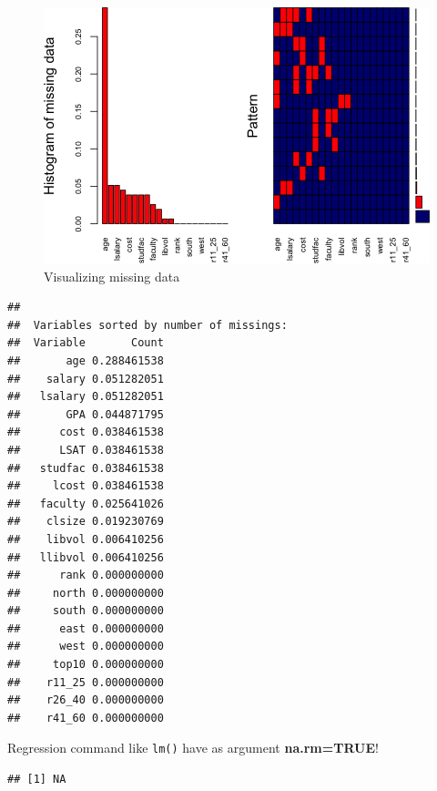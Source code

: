 \documentclass[]{book}
\newenvironment{Shaded}{\begin{snugshade}}{\end{snugshade}}
\newcommand{\CommentTok}[1]{\textcolor[rgb]{0.56,0.35,0.01}{\textit{#1}}}
\newcommand{\DataTypeTok}[1]{\textcolor[rgb]{0.13,0.29,0.53}{#1}}
\newcommand{\KeywordTok}[1]{\textcolor[rgb]{0.13,0.29,0.53}{\textbf{#1}}}
\newcommand{\NormalTok}[1]{#1}
\newcommand{\OperatorTok}[1]{\textcolor[rgb]{0.81,0.36,0.00}{\textbf{#1}}}
\newcommand{\OtherTok}[1]{\textcolor[rgb]{0.56,0.35,0.01}{#1}}
\begin{document}
\begin{figure}

{\centering \includegraphics[width=0.8\linewidth]{MEM5220_R_files/figure-latex/fig20-1} 

}

\caption{Visualizing missing data}\label{fig:fig20}
\end{figure}

\begin{verbatim}
## 
##  Variables sorted by number of missings: 
##  Variable       Count
##       age 0.288461538
##    salary 0.051282051
##   lsalary 0.051282051
##       GPA 0.044871795
##      cost 0.038461538
##      LSAT 0.038461538
##   studfac 0.038461538
##     lcost 0.038461538
##   faculty 0.025641026
##    clsize 0.019230769
##    libvol 0.006410256
##   llibvol 0.006410256
##      rank 0.000000000
##     north 0.000000000
##     south 0.000000000
##      east 0.000000000
##      west 0.000000000
##     top10 0.000000000
##    r11_25 0.000000000
##    r26_40 0.000000000
##    r41_60 0.000000000
\end{verbatim}

Regression command like \texttt{lm()} have as argument \textbf{na.rm=TRUE}!

\begin{Shaded}
\end{Shaded}

\begin{verbatim}
## [1] NA
\end{verbatim}

\begin{Shaded}
\end{Shaded}
\end{document}
